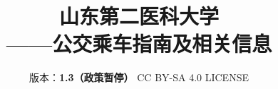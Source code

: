 

\title{%
    \normalsize
    \vspace{120pt}
    {\Huge\textbf{山东第二医科大学\\[5pt]——公交乘车指南及相关信息}}
}
\author{%
    版本：\textbf{1.3（政策暂停）} \qquad%
    CC BY-SA 4.0 LICENSE \qquad%
    }
\date{\CurrentCustomTime}
\maketitle

\renewcommand{\thefootnote}{\arabic{footnote}}
